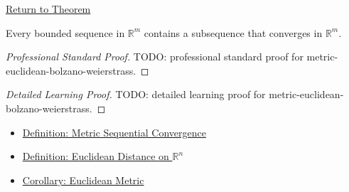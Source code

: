 \newpage
{}
\label{prf:metric-euclidean-bolzano-weierstrass}

\begin{remark*}[Return]
\hyperref[thm:metric-euclidean-bolzano-weierstrass]{Return to Theorem}
\end{remark*}

\begin{theorem*}
Every bounded sequence in \(\mathbb{R}^m\) contains a subsequence that
converges in \(\mathbb{R}^m\).
\end{theorem*}

\begin{proof}[Professional Standard Proof]
\LRAProofBodyStart
TODO: professional standard proof for metric-euclidean-bolzano-weierstrass.
\end{proof}

\begin{proof}[Detailed Learning Proof]
\LRAProofBodyStart
TODO: detailed learning proof for metric-euclidean-bolzano-weierstrass.
\end{proof}

\begin{remark*}
\end{remark*}

\begin{dependencies}
\begin{itemize}
  \item \hyperref[def:metric-sequential-convergence]{Definition: Metric Sequential Convergence}
  \item \hyperref[def:euclidean-distance-rn]{Definition: Euclidean Distance on \(\mathbb{R}^n\)}
  \item \hyperref[cor:euclidean-metric]{Corollary: Euclidean Metric}
\end{itemize}
\end{dependencies}

\clearpage
